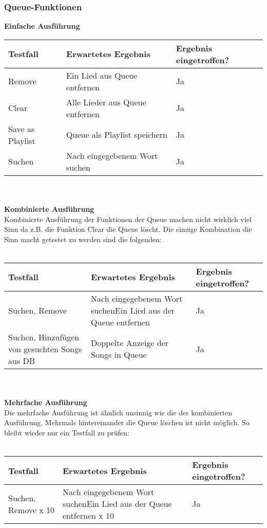 \subsubsection{Queue-Funktionen}
\textbf{Einfache Ausführung} \\
\begin{tabularx}{\textwidth}{|X|l|p{3cm}|}
    \hline
    \textbf{Testfall} & \textbf{Erwartetes Ergebnis} & \textbf{Ergebnis eingetroffen?}\\
    \hline
    Remove & Ein Lied aus Queue entfernen & Ja\\
    \hline
    Clear & Alle Lieder aus Queue entfernen & Ja\\
    \hline
    Save as Playlist & Queue als Playlist speichern & Ja\\
    \hline
    Suchen & Nach eingegebenem Wort suchen & Ja\\
    \hline
\end{tabularx}
\\
\\
\textbf{Kombinierte Ausführung} \\
Kombinierte Ausführung der Funktionen der Queue machen nicht wirklich viel Sinn da z.B.
die Funktion Clear die Queue löscht. Die einzige Kombination die Sinn macht getestet zu werden sind die 
folgenden: \\ \\  
\begin{tabularx}{\textwidth}{|X|X|p{3cm}|}
    \hline
    \textbf{Testfall} & \textbf{Erwartetes Ergebnis} & \textbf{Ergebnis eingetroffen?}\\
    \hline
    Suchen, Remove & Nach eingegebenem Wort suchen\newline Ein Lied aus der Queue entfernen & Ja\\
    \hline
    Suchen, Hinzufügen von gesuchten Songs aus DB & Doppelte Anzeige der Songs in Queue & Ja\\
    \hline
\end{tabularx}
\\
\\
\textbf{Mehrfache Ausführung} \\
Die mehrfache Ausführung ist ähnlich unsinnig wie die der kombinierten Ausführung.
Mehrmals hintereinander die Queue löschen ist nicht möglich. So bleibt wieder nur ein Testfall zu prüfen:\ \\ \\
\begin{tabularx}{\textwidth}{|X|p{7cm}|p{3cm}|}
    \hline
    \textbf{Testfall} & \textbf{Erwartetes Ergebnis} & \textbf{Ergebnis eingetroffen?}\\
    \hline
    Suchen, Remove x 10 & Nach eingegebenem Wort suchen\newline Ein Lied aus der Queue entfernen x 10& Ja\\
    \hline
\end{tabularx}

